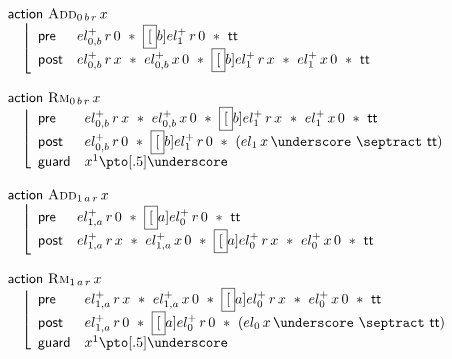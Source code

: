 \documentclass[12pt,a4paper]{article}
\renewcommand{\true}{\mathsf{tt}}
\begin{document}
\[
\begin{array}{l}
{\sf action} \Add 0br\,x \\
\quad\left\lfloor\begin{array}{ll}
{\sf pre} & \elhat 0b^+\,r\,0  * \boxed[b]{el_1^+\,r\,0  * \true} \\
{\sf post} & \elhat 0b^+\,r\,x  *  \elhat 0b^+\,x\,0  *  \boxed[b]{el_1^+\,r\,x  *  el_1^+\,x\,0  *  \true}
\end{array}\right. \\ \\
{\sf action} \Rm 0br\,x \\
\quad\left\lfloor\begin{array}{ll}
{\sf pre} & \elhat 0b^+\,r\,x  *  \elhat 0b^+\,x\,0  *  \boxed[b]{el_1^+\,r\,x  *  el_1^+\,x\,0  *  \true} \\
{\sf post} & \elhat 0b^+\,r\,0  * \boxed[b]{el_1^+\,r\,0  * (el_1\,x\,\underscore  \septract  \true)} \\
{\sf guard} & x^1\pto[.5]\underscore
\end{array}\right.\\ \\
{\sf action}  \Add 1ar\,x \\
\quad\left\lfloor\begin{array}{ll} 
{\sf pre} & \elhat 1a^+\,r\,0  * \boxed[a]{el_0^+\,r\,0  * \true} \\
{\sf post} & \elhat 1a^+\,r\,x  *  \elhat 1a^+\,x\,0  *  \boxed[a]{el_0^+\,r\,x  *  el_0^+\,x\,0  *  \true}
\end{array}\right. \\ \\
{\sf action} \Rm 1ar\,x \\
\quad\left\lfloor\begin{array}{ll}
{\sf pre} & \elhat 1a^+\,r\,x  *  \elhat 1a^+\,x\,0  *  \boxed[a]{el_0^+\,r\,x  *  el_0^+\,x\,0  *  \true} \\
{\sf post} & \elhat 1a^+\,r\,0  * \boxed[a]{el_0^+\,r\,0  * (el_0\,x\,\underscore  \septract  \true)} \\
{\sf guard} & x^1\pto[.5]\underscore
\end{array}\right.
\end{array}
\]
\end{document}
